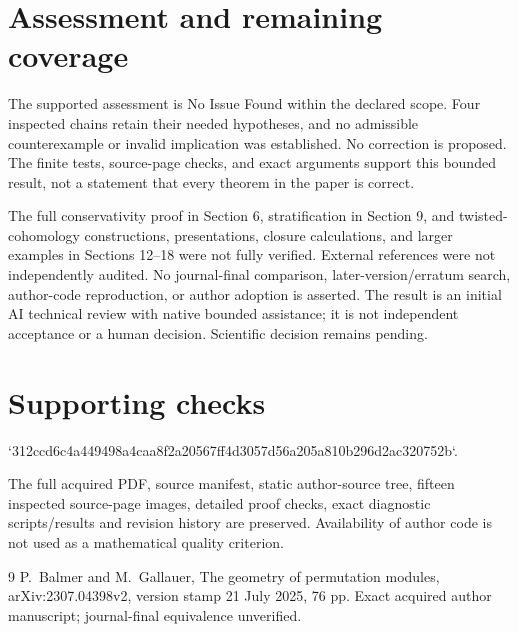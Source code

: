 \documentclass[10pt]{article}
\begin{document}
\section*{Assessment and remaining coverage}
The supported assessment is No Issue Found within the declared scope. Four inspected chains retain their needed hypotheses, and no admissible counterexample or invalid implication was established. No correction is proposed. The finite tests, source-page checks, and exact arguments support this bounded result, not a statement that every theorem in the paper is correct.\par
The full conservativity proof in Section 6, stratification in Section 9, and twisted-cohomology constructions, presentations, closure calculations, and larger examples in Sections 12–18 were not fully verified. External references were not independently audited. No journal-final comparison, later-version/erratum search, author-code reproduction, or author adoption is asserted. The result is an initial AI technical review with native bounded assistance; it is not independent acceptance or a human decision. Scientific decision remains pending.\par
\section*{Supporting checks}
`312ccd6c4a449498a4caa8f2a20567ff4d3057d56a205a810b296d2ac320752b`.\par
The full acquired PDF, source manifest, static author-source tree, fifteen inspected source-page images, detailed proof checks, exact diagnostic scripts/results and revision history are preserved. Availability of author code is not used as a mathematical quality criterion.\par
9 P. Balmer and M. Gallauer, The geometry of permutation modules, arXiv:2307.04398v2, version stamp 21 July 2025, 76 pp. Exact acquired author manuscript; journal-final equivalence unverified.\par
\end{document}
